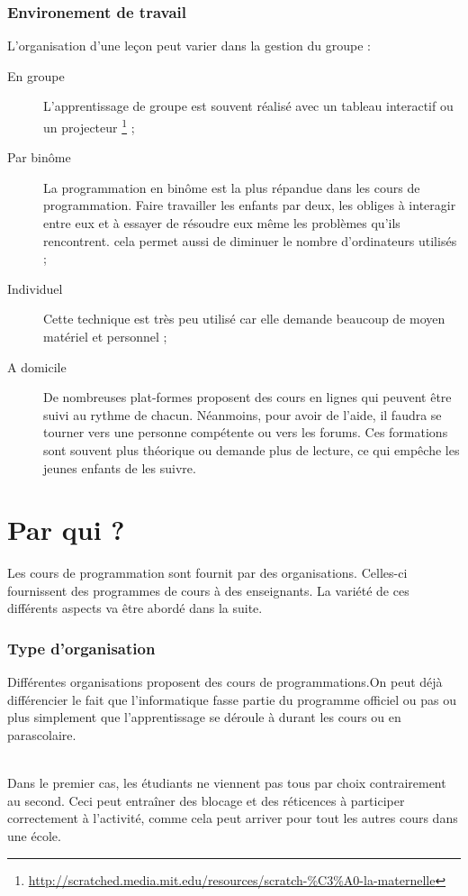 \subsubsection{Environement de travail}
L'organisation d'une leçon peut varier dans la gestion du groupe :
\begin{description}
  \item[En groupe] L'apprentissage de groupe est souvent réalisé avec un tableau interactif ou un projecteur \footnote{\url{http://scratched.media.mit.edu/resources/scratch-\%C3\%A0-la-maternelle}} ;
  \item[Par binôme] La programmation en binôme est la plus répandue dans les cours de programmation. Faire travailler les enfants par deux, les obliges à interagir entre eux et à essayer de résoudre eux même les problèmes qu'ils rencontrent. cela permet aussi de diminuer le nombre d'ordinateurs utilisés ;
  \item[Individuel] Cette technique est très peu utilisé car elle demande beaucoup de moyen matériel et personnel ;
  \item[A domicile] De nombreuses plat-formes proposent des cours en lignes qui peuvent être suivi au rythme de chacun. Néanmoins, pour avoir de l'aide, il faudra se tourner vers une personne compétente ou vers les forums. Ces formations sont souvent plus théorique ou demande plus de lecture, ce qui empêche les jeunes enfants de les suivre.
\end{description}

\section{Par qui ?}
Les cours de programmation sont fournit par des organisations. Celles-ci fournissent des programmes de cours à des enseignants. La variété de ces différents aspects va être abordé dans la suite.

\subsubsection{Type d'organisation}
Différentes organisations proposent des cours de programmations.On peut déjà différencier le fait que l'informatique fasse partie du programme officiel ou pas ou plus simplement que l'apprentissage se déroule à durant les cours ou en parascolaire.

~\\

Dans le premier cas, les étudiants ne viennent pas tous par choix contrairement au second. Ceci peut entraîner des blocage et des réticences à participer correctement à l'activité, comme cela peut arriver pour tout les autres cours dans une école.

